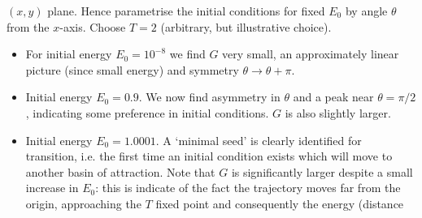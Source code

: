 \documentclass{jknotes}
\begin{document}
$(x,y)$ plane. Hence parametrise the initial conditions for fixed $E_0$ by
angle $\theta$ from the $x$-axis. Choose $T=2$ (arbitrary, but illustrative
choice).
\begin{itemize}
	\item For initial energy $E_0 = 10^{-8}$ we find $G$ very small, an
		approximately linear picture (since small energy) and symmetry $\theta
		\to \theta+\pi$.
		\begin{center}
		\end{center}
	\item Initial energy $E_0 = 0.9$. We now find asymmetry in $\theta$ and a
		peak near $\theta = \pi/2$, indicating some preference in initial
		conditions. $G$ is also slightly larger.
		\begin{center}
		\end{center}
	\item Initial energy $E_0 = 1.0001$. A `minimal seed' is clearly
		identified for transition, i.e. the first time an initial condition
		exists which will move to another basin of attraction. Note that $G$
		is significantly larger despite a small increase in $E_0$: this is
		indicate of the fact the trajectory moves far from the origin,
		approaching the $T$ fixed point and consequently the energy (distance

\end{itemize}
\end{document}
